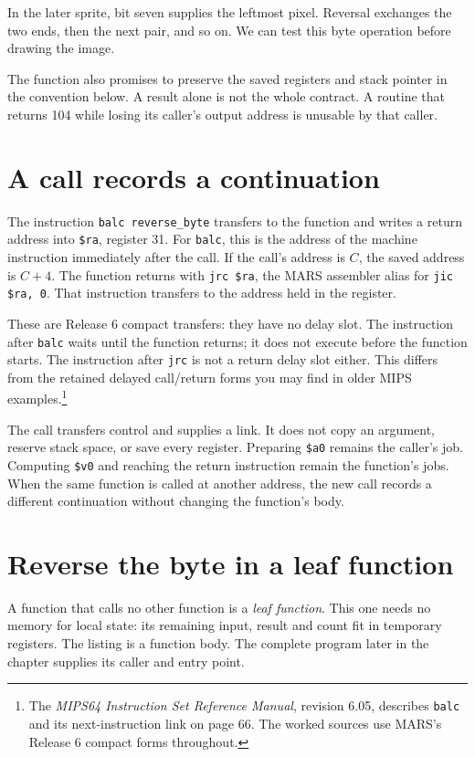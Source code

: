 In the later sprite, bit seven supplies the leftmost pixel. Reversal exchanges
the two ends, then the next pair, and so on. We can test this byte operation
before drawing the image.

The function also promises to preserve the saved registers and stack pointer in
the convention below. A result alone is not the whole contract. A routine that
returns 104 while losing its caller's output address is unusable by that caller.

\section{A call records a continuation}

The instruction \texttt{balc reverse\_byte} transfers to the function and writes
a return address into \texttt{\$ra}, register 31. For \texttt{balc}, this is the
address of the machine instruction immediately after the call. If the call's
address is $C$, the saved address is $C+4$. The function returns with
\texttt{jrc \$ra}, the MARS assembler alias for \texttt{jic \$ra, 0}.
That instruction transfers to the address held in the register.

These are Release 6 compact transfers: they have no delay slot. The instruction
after \texttt{balc} waits until the function returns; it does not execute before
the function starts. The instruction after \texttt{jrc} is not a return delay
slot either. This differs from the retained delayed call/return forms you may
find in older MIPS examples.\footnote{The \emph{MIPS64 Instruction Set Reference
    Manual}, revision 6.05, describes \texttt{balc} and its next-instruction link on
  page 66. The worked sources use MARS's Release 6 compact forms throughout.}

The call transfers control and supplies a link. It does not copy an argument,
reserve stack space, or save every register. Preparing \texttt{\$a0} remains the
caller's job. Computing \texttt{\$v0} and reaching the return instruction remain
the function's jobs. When the same function is called at another address, the new
call records a different continuation without changing the function's body.

\section{Reverse the byte in a leaf function}

A function that calls no other function is a \emph{leaf function}. This one needs
no memory for local state: its remaining input, result and count fit in temporary
registers. The listing is a function body. The complete program later in the
chapter supplies its caller and entry point.

